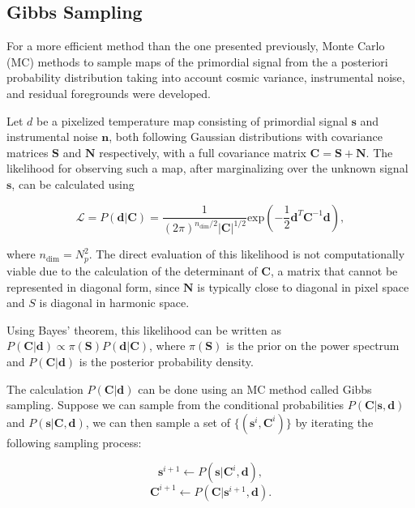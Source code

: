 \documentclass[openany,a4paper,12pt,oneside]{book}
\begin{document}
\begin{spacing}{1.5}
\section{Gibbs Sampling}

For a more efficient method than the one presented previously, Monte Carlo (MC) methods to sample maps of the primordial signal from the a posteriori probability distribution taking into account cosmic variance, instrumental noise, and residual foregrounds were developed\cite{Jewell_2004,Eriksen_2004,Wandelt_2004}. 

Let $d$ be a pixelized temperature map consisting of primordial signal $\mathbf{s}$ and instrumental noise $\mathbf{n}$, both following Gaussian distributions with covariance matrices $\mathbf{S}$ and $\mathbf{N}$ respectively, with a full covariance matrix $\mathbf{C}=\mathbf{S}+\mathbf{N}$. The likelihood for observing such a map, after marginalizing over the unknown signal $\mathbf{s}$, can be calculated using

\begin{equation}\label{ch4:Likelihood}
	\mathcal{L}=P(\mathbf{d}|\mathbf{C})=\frac{1}{(2\pi)^{n_\text{dim}/2}|\mathbf{C}|^{1/2}}\text{exp}\left(-\frac{1}{2}\mathbf{d}^T \mathbf{C}^{-1} \mathbf{d}\right),
\end{equation}

\noindent where $n_\text{dim}=N_p^2$. The direct evaluation of this likelihood is not computationally viable due to the calculation of the determinant of $\mathbf{C}$, a matrix that cannot be represented in diagonal form, since $\mathbf{N}$ is typically close to diagonal in pixel space and $S$ is diagonal in harmonic space.

Using Bayes' theorem, this likelihood can be written as $P(\mathbf{C}|\mathbf{d})\propto \pi(\mathbf{S})P(\mathbf{d}|\mathbf{C})$, where $\pi(\mathbf{S})$ is the prior on the power spectrum and $P(\mathbf{C}|\mathbf{d})$ is the posterior probability density. 

The calculation $P(\mathbf{C}|\mathbf{d})$ can be done using an MC method called Gibbs sampling. Suppose we can sample from the conditional probabilities $P(\mathbf{C}|\mathbf{s}, \mathbf{d})$ and $P(\mathbf{s}|\mathbf{C}, \mathbf{d})$, we can then sample a set of $\{(\mathbf{s}^i, \mathbf{C}^i)\}$ by iterating the following sampling process\cite{Chu_2005}:

\begin{equation}\label{gibbs_sample1}
\mathbf{s}^{i+1}\leftarrow P(\mathbf{s}|\mathbf{C}^i, \mathbf{d}),
\end{equation}
\begin{equation}\label{gibbs_sample2}
\mathbf{C}^{i+1}\leftarrow P(\mathbf{C}|\mathbf{s}^{i+1}, \mathbf{d}).
\end{equation}


\end{spacing}
\end{document}
